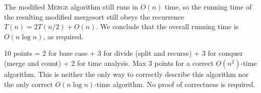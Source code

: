 \documentclass[11pt]{article}
\begin{document}
\begin{enumerate}
\begin{solution}
The modified \textsc{Merge} algorithm still runs in $O(n)$ time, so the running time of the resulting modified mergesort still obeys the recurrence $T(n) = 2T(n/2) + O(n)$.  We conclude that the overall running time is $O(n\log n)$, as required.
\end{solution}


\begin{rubric}
10 points = 2 for base case + 3 for divide (split and recurse) + 3 for conquer (merge and count) + 2 for time analysis.  Max 3 points for a correct $O(n^2)$-time algorithm.  This is neither the only way to correctly describe this algorithm nor the only correct $O(n\log n)$-time algorithm.  No proof of correctness is required.
\end{rubric}

\end{enumerate}
\end{document}
